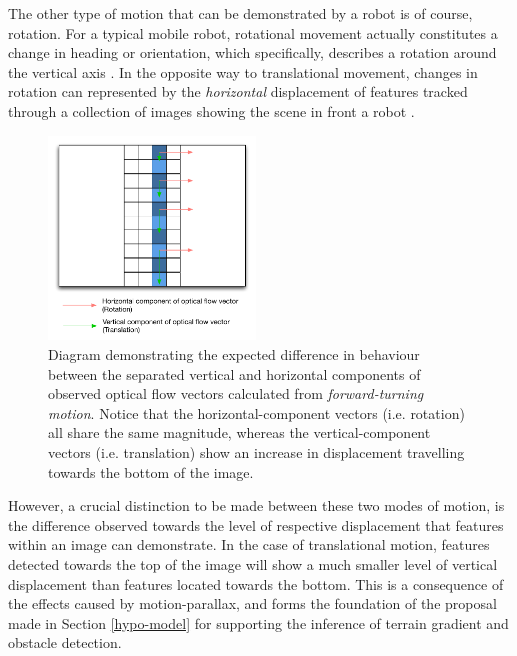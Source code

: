 The other type of motion that can be demonstrated by a robot is of course, rotation. For a typical mobile robot, rotational movement actually constitutes a change in heading or orientation, which specifically, describes a rotation around the vertical axis \cite{campbell}. In the opposite way to translational movement, changes in rotation can represented by the \textit{horizontal} displacement of features tracked through a collection of images showing the scene in front a robot \cite{labrosse}. 

\begin{figure}
\vspace{-20pt}
  \begin{center}
    \includegraphics[width=0.49\textwidth]{images/rotation_diag.pdf}
  \end{center}
  \vspace{-10pt}
  \caption{Diagram demonstrating the expected difference in behaviour between the separated vertical and horizontal components of observed optical flow vectors calculated from \textit{forward-turning motion}. Notice that the horizontal-component vectors (i.e. rotation) all share the same magnitude, whereas the vertical-component vectors (i.e. translation) show an increase in displacement travelling towards the bottom of the image.}
  \label{fig:rotation}
  \vspace{-10pt}
\end{figure}

However, a crucial distinction to be made between these two modes of motion, is the difference observed towards the level of respective displacement that features within an image can demonstrate. In the case of translational motion, features detected towards the top of the image will show a much smaller level of vertical displacement than features located towards the bottom. This is a consequence of the effects caused by motion-parallax, and forms the foundation of the proposal made in Section \ref{hypo-model} for supporting the inference of terrain gradient and obstacle detection. 

